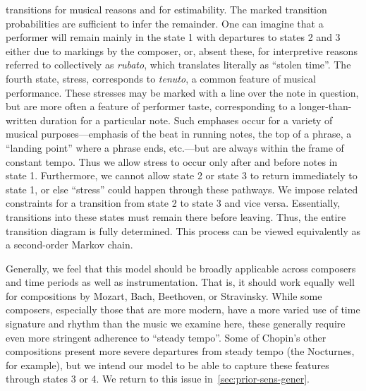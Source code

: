 \documentclass[aoas]{imsart}
\begin{document}
transitions for musical reasons and for estimability. The marked
transition probabilities are sufficient to infer the remainder. One
can imagine that a performer will remain mainly in the state 1 with
departures to states 2 and 3 either due to markings by the composer,
or, absent these, for interpretive reasons referred to collectively as
{\em rubato}, which
translates literally as ``stolen time''. The fourth
state, stress, corresponds to {\em tenuto}, a common feature of
musical performance. These stresses may be marked with a line over the
note in question, but are more often a feature of performer taste,
corresponding to a longer-than-written duration for a particular
note. Such emphases occur for a variety of musical purposes---emphasis
of the beat in running notes, the top of a
phrase, a ``landing point'' where a phrase ends, etc.---but are always
within the frame of constant tempo. Thus we allow stress to occur only
after and before notes in state 1. Furthermore, we cannot allow
state 2 or state 3 to return immediately to state 1, or else ``stress'' could
happen through these pathways. We impose related constraints for a transition from state 2
to state 3 and vice versa. Essentially, transitions into these states must remain
there before leaving. Thus, the entire transition diagram is
fully determined. This process can  be viewed equivalently as a
second-order Markov chain.

Generally, we feel that this model should be broadly applicable across
composers and time periods as well as instrumentation. That
is, it should work equally well for compositions by Mozart, Bach,
Beethoven, or Stravinsky. While some composers, especially those that
are more modern, have a more varied use of time signature and rhythm
than the music we examine here, these generally require even more stringent
adherence to ``steady tempo''. Some of Chopin's other compositions
present more severe departures from steady tempo (the Nocturnes,
for example), but we intend our model to be able to capture these
features through states 3 or 4. We return to this issue in~\autoref{sec:prior-sens-gener}.
\end{document}
